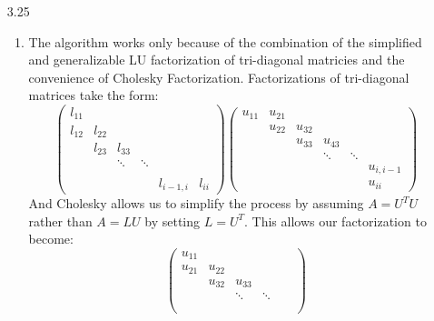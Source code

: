 \documentclass[11pt,a4paper,draft]{article}
\begin{document}
\begin{itemize}
\begin{enumerate} [label={\alph*)}]
			\end{enumerate}
		\item [3.25] $ $
			\begin{enumerate} [label={\alph*)}]
			\item The algorithm works only because of the combination of the simplified and generalizable LU factorization of tri-diagonal matricies and the convenience of Cholesky Factorization. Factorizations of tri-diagonal matrices take the form:
			$$\begin{pmatrix}
				l_{11} &        &        &        &            &        \\ 
				l_{12} & l_{22} &        &        &            &        \\
				       & l_{23} & l_{33} &        &            &        \\
				       &        & \ddots & \ddots &            &        \\
				       &        &        &        &            &        \\
			           &        &        &        & l_{i-1,i}  & l_{ii}
			\end{pmatrix}
			\begin{pmatrix}
			u_{11} & u_{21} &        &        &        &            \\ 
			       & u_{22} & u_{32} &        &        &            \\
			       &        & u_{33} & u_{43} &        &            \\
		           &        &        & \ddots & \ddots &            \\
			       &        &        &        &        & u_{i,i-1}  \\
			       &        &        &        &        & u_{ii}
			\end{pmatrix}
			$$
			And Cholesky allows us to simplify the process by assuming $A=U^TU$ rather than $A=LU$ by setting $L=U^T$. This allows our factorization to become:
			$$\begin{pmatrix}
			u_{11} &        &        &        &            &        \\ 
			u_{21} & u_{22} &        &        &            &        \\
			       & u_{32} & u_{33} &        &            &        \\
				   &        & \ddots & \ddots &            &        \\
				   &        &        &        &            &        \\

\end{pmatrix}$$
\end{enumerate}
\end{itemize}
\end{document}
